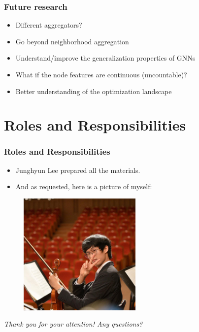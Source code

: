 \documentclass{beamer}
\begin{document}
\begin{frame}
\frametitle{Future research}

\begin{itemize}
	\item Different aggregators? \pause
	\item Go beyond neighborhood aggregation \pause
	\item Understand/improve the generalization properties of GNNs \pause
	\item What if the node features are continuous (uncountable)? \pause
	\item Better understanding of the optimization landscape
\end{itemize}

\end{frame}



\section{Roles and Responsibilities}

\begin{frame}
\frametitle{Roles and Responsibilities}

\begin{itemize}
\item Junghyun Lee prepared all the materials. \pause
\item And as requested, here is a picture of myself:
\end{itemize}

\begin{figure}[hbt]
  \includegraphics[height=6cm]{facebook_profile_pic.jpg}
  \centering
\end{figure}

\end{frame}




\begin{frame}{}
  \centering \Large
  \emph{Thank you for your attention! Any questions?}
\end{frame}

\end{document}
